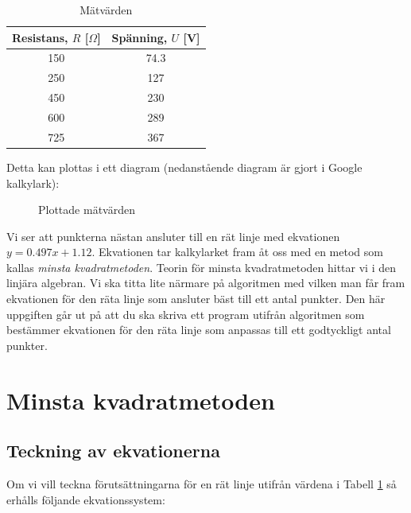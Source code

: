 \documentclass[titlepage, 10pt]{article}
\begin{document}
\begin{center}
  \begin{table}[H]
    \centering
    \begin{tabular}{ |c|c|  }
    \rowcolor{gray!50}
      \hline
      Resistans, $R$ [$\Omega$] & Spänning, $U$ [V]\\
      \hline
      150 & 74.3 \\
      250 & 127\\
      450 & 230\\
      600 & 289\\
      725 & 367\\
      \hline
    \end{tabular}
    \vspace{0.5em}
    \caption{Mätvärden}
    \label{table:maetvaerden}
    \vspace{-4em}
  \end{table}
\end{center}

Detta kan plottas i ett diagram (nedanstående diagram är gjort i Google
kalkylark):

\begin{figure}[H] %
  \centering %
  \caption{Plottade mätvärden}
  \label{fig:diagram}
\end{figure}

Vi ser att punkterna nästan ansluter till en rät linje med ekvationen
$y=0.497x+1.12$. Ekvationen tar kalkylarket fram åt oss med en metod som kallas
\emph{minsta kvadratmetoden}. Teorin för minsta kvadratmetoden hittar vi i den
linjära algebran. Vi ska titta lite närmare på algoritmen med vilken man får
fram ekvationen för den räta linje som ansluter bäst till ett antal punkter.
Den här uppgiften går ut på att du ska skriva ett program utifrån algoritmen
som bestämmer ekvationen för den räta linje som anpassas till ett godtyckligt
antal punkter.

\section{Minsta kvadratmetoden}
\subsection{Teckning av ekvationerna}

Om vi vill teckna förutsättningarna för en rät linje utifrån värdena i Tabell
\ref{table:maetvaerden}
så erhålls följande ekvationssystem:
\end{document}
